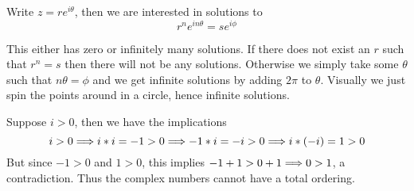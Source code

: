 \newpage
\begin{exercise}
	Write $z = re^{i\theta}$, then we are interested in solutions to
	\[ r^n e^{i n\theta} = s e^{i\phi} \]
	
	This either has zero or infinitely many solutions. If there does not exist an $r$ such that $r^n = s$ then there will not be any solutions. Otherwise we simply take some $\theta$ such that $n \theta = \phi$ and we get infinite solutions by adding $2\pi$ to $\theta$. Visually we just spin the points around in a circle, hence infinite solutions.
\end{exercise}

\begin{exercise}
	Suppose $i > 0$, then we have the implications
	\[ i > 0 \Longrightarrow i * i = -1 > 0 \Longrightarrow -1 * i = -i > 0 \Longrightarrow i * (-i) = 1 > 0 \]
	But since $-1 > 0$ and $1 > 0$, this implies $-1 + 1 > 0 + 1 \Longrightarrow 0 > 1$, a contradiction. Thus the complex numbers cannot have a total ordering.
\end{exercise}

